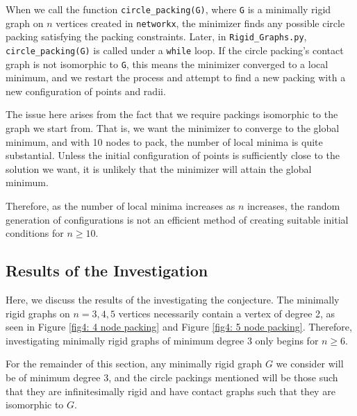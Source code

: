 \begin{flushleft}
When we call the function \texttt{circle\_packing(G)}, where \texttt{G} is a minimally rigid graph on $n$ vertices created in \texttt{networkx}, the minimizer finds any possible circle packing satisfying the packing constraints. Later, in \texttt{Rigid\_Graphs.py}, \texttt{circle\_packing(G)} is called under a \texttt{while} loop. If the circle packing's contact graph is not isomorphic to \texttt{G}, this means the minimizer converged to a local minimum, and we restart the process and attempt to find a new packing with a new configuration of points and radii. 
\end{flushleft}

\begin{flushleft}
The issue here arises from the fact that we require packings isomorphic to the graph we start from. That is, we want the minimizer to converge to the global minimum, and with 10 nodes to pack, the number of local minima is quite substantial. Unless the initial configuration of points is sufficiently close to the solution we want, it is unlikely that the minimizer will attain the global minimum. 
\end{flushleft}

\begin{flushleft}
Therefore, as the number of local minima increases as $n$ increases, the random generation of configurations is not an efficient method of creating suitable initial conditions for $n \geq 10$.
\end{flushleft}

\subsection{Results of the Investigation}

\begin{flushleft}
Here, we discuss the results of the investigating the conjecture. The minimally rigid graphs on $n = 3,4,5$ vertices necessarily contain a vertex of degree 2, as seen in Figure \ref{fig4: 4 node packing} and Figure \ref{fig4: 5 node packing}. Therefore, investigating minimally rigid graphs of minimum degree 3 only begins for $n \geq 6$.
\end{flushleft}

\begin{flushleft}
For the remainder of this section, any minimally rigid graph $G$ we consider will be of minimum degree 3, and the circle packings mentioned will be those such that they are infinitesimally rigid and have contact graphs such that they are isomorphic to $G$.
\end{flushleft}

